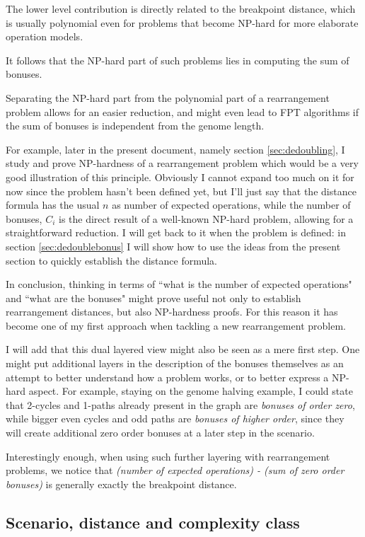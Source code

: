 \documentclass[11pt,final,twoside,nofrench]{thlifl}
\begin{document}
The lower level contribution is directly related to the breakpoint distance, which is usually polynomial even for problems that become NP-hard for more elaborate operation models.

It follows that the NP-hard part of such problems lies in computing the sum of bonuses.

Separating the NP-hard part from the polynomial part of a rearrangement problem allows for an easier reduction, and might even lead to FPT algorithms if the sum of bonuses is independent from the genome length.

For example, later in the present document, namely section \ref{sec:dedoubling}, I study and prove NP-hardness of a rearrangement problem which would be a very good illustration of this principle. Obviously I cannot expand too much on it for now since the problem hasn't been defined yet, but I'll just say that the distance formula has the usual $n$ as number of expected operations, while the number of bonuses, $C_i$ is the direct result of a well-known NP-hard problem, allowing for a straightforward reduction. I will get back to it when the problem is defined: in section \ref{sec:dedoublebonus} I will show how to use the ideas from the present section to quickly establish the distance formula.

In conclusion, thinking in terms of ``what is the number of expected operations" and ``what are the bonuses" might prove useful not only to establish rearrangement distances, but also NP-hardness proofs. For this reason it has become one of my first approach when tackling a new rearrangement problem.

I will add that this dual layered view might also be seen as a mere first step. One might put additional layers in the description of the bonuses themselves as an attempt to better understand how a problem works, or to better express a NP-hard aspect. For example, staying on the genome halving example, I could state that 2-cycles and 1-paths already present in the graph are \emph{bonuses of order zero}, while bigger even cycles and odd paths are \emph{bonuses of higher order}, since they will create additional zero order bonuses at a later step in the scenario.

Interestingly enough, when using such further layering with rearrangement problems, we notice that \emph{(number of expected operations) - (sum of zero order bonuses)} is generally exactly the breakpoint distance.

\subsection{Scenario, distance and complexity class}
\label{sec:distscenar}
\end{document}
